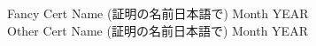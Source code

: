 \begin{CJK}{UTF8}{min}
Fancy Cert Name (証明の名前日本語で) \hfill Month YEAR\\

Other Cert Name (証明の名前日本語で) \hfill Month YEAR\\
\end{CJK}
